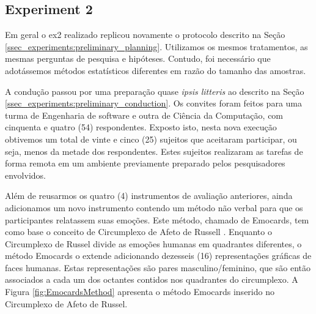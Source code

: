 


\subsection{Experiment 2}
\label{ssec_experiments:Experiment2}

Em geral o \ac{ex2} realizado replicou novamente o protocolo descrito na Seção \ref{ssec_experiments:preliminary_planning}.
Utilizamos os mesmos tratamentos, as mesmas perguntas de pesquisa e hipóteses.
Contudo, foi necessário que adotássemos métodos estatísticos diferentes em razão do tamanho das amostras.

A condução passou por uma preparação quase \textit{ipsis litteris} ao descrito na Seção \ref{ssec_experiments:preliminary_conduction}. 
Os convites foram feitos para uma turma de Engenharia de software e outra de Ciência da Computação, com cinquenta e quatro (54) respondentes.
Exposto isto, nesta nova execução obtivemos um total de vinte e cinco (25) sujeitos que aceitaram participar, ou seja, menos da metade dos respondentes.
Estes sujeitos realizaram as tarefas de forma remota em um ambiente previamente preparado pelos pesquisadores envolvidos.

Além de reusarmos os quatro (4) instrumentos de avaliação anteriores, ainda adicionamos um novo instrumento contendo um método não verbal para que os participantes relatassem suas emoções. 
Este método, chamado de Emocards, tem como base o conceito de Circumplexo de Afeto de Russell \cite{desmet:2001}.
Enquanto o Circumplexo de Russel divide as emoções humanas em quadrantes diferentes, o método Emocards o extende adicionando dezesseis (16) representações gráficas de faces humanas.
Estas representações são pares masculino/feminino, que são então associados a cada um dos octantes contidos nos quadrantes do circumplexo. 
A Figura \ref{fig:EmocardsMethod} apresenta o método Emocards inserido no Circumplexo de Afeto de Russel. 

